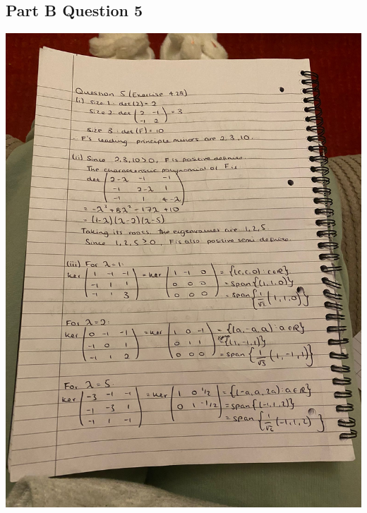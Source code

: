 \documentclass{article}
\begin{document}
\subsection{Part B Question 5}

\includegraphics[scale = 0.2]{IMG-20231126-WA0003.jpg}
\end{document}
